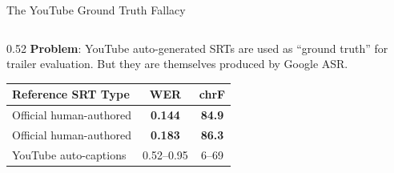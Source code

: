 \documentclass[aspectratio=169]{beamer}
\begin{document}
\begin{frame}{The YouTube Ground Truth Fallacy}
  \begin{columns}[T]
    \begin{column}{0.52\textwidth}
      \textbf{Problem}: YouTube auto-generated SRTs are used as ``ground truth'' for trailer evaluation. But they are themselves produced by Google ASR.

      \vspace{0.3cm}
      \begin{center}
        \small
        \begin{tabular}{@{}lcc@{}}
          \toprule
          \textbf{Reference SRT Type} & \textbf{WER} & \textbf{chrF} \\
          \midrule
          Official human-authored & \textbf{0.144} & \textbf{84.9} \\
          Official human-authored & \textbf{0.183} & \textbf{86.3} \\
          YouTube auto-captions & 0.52–0.95 & 6–69 \\
          \bottomrule
        \end{tabular}
      \end{center}


\end{column}
\end{columns}
\end{frame}
\end{document}
